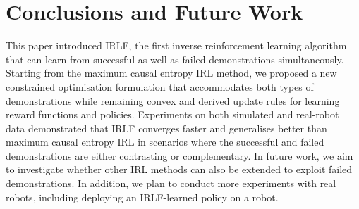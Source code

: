 \documentclass{aamas2016}
\newcommand{\sw}[1]{\textcolor{red}{SW: #1}}
\newcommand{\jm}[1]{\textcolor{blue}{Joao: #1}}
\newcommand{\sw}[1]{}
\newcommand{\jm}[1]{}
\begin{document}

\section{Conclusions and Future Work}


This paper introduced IRLF, the first inverse reinforcement learning algorithm that can learn from successful as well as failed demonstrations simultaneously. Starting from the maximum causal entropy IRL method, we proposed a new constrained optimisation formulation that accommodates both types of demonstrations while remaining convex and derived update rules for learning reward functions and policies. Experiments on both simulated and real-robot data demonstrated that IRLF converges faster and generalises better than maximum causal entropy IRL in scenarios where the successful and failed demonstrations are either contrasting or complementary.  In future work, we aim to investigate whether other IRL methods can also be extended to exploit failed demonstrations.  In addition, we plan to conduct more experiments with real robots, including deploying an IRLF-learned policy on a robot.





	
\end{document}
